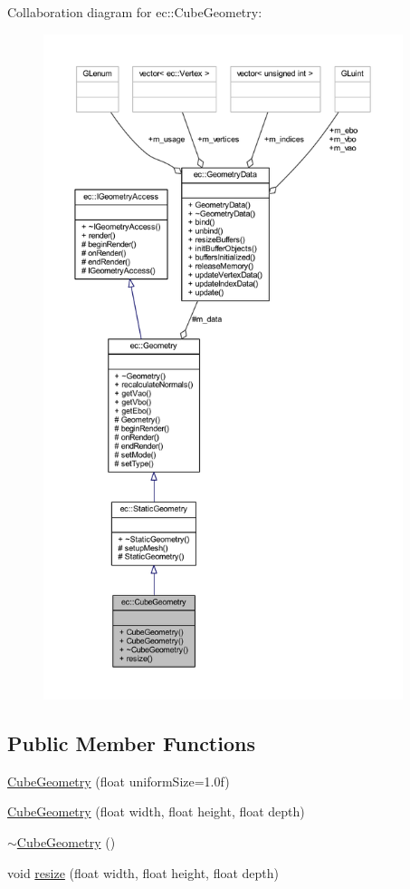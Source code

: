 Collaboration diagram for ec\+:\+:Cube\+Geometry\+:\nopagebreak
\begin{figure}[H]
\begin{center}
\leavevmode
\includegraphics[height=550pt]{classec_1_1_cube_geometry__coll__graph}
\end{center}
\end{figure}
\subsection*{Public Member Functions}
\begin{DoxyCompactItemize}
\item 
\mbox{\hyperlink{classec_1_1_cube_geometry_a539617a3a7e98e1a09af01e2328bac30}{Cube\+Geometry}} (float uniform\+Size=1.\+0f)
\item 
\mbox{\hyperlink{classec_1_1_cube_geometry_ac4ffe05d266c00e8e337233c4c48d29f}{Cube\+Geometry}} (float width, float height, float depth)
\item 
\mbox{\hyperlink{classec_1_1_cube_geometry_a8e8e46246b76cdf551d59d3f5c32d88d}{$\sim$\+Cube\+Geometry}} ()
\item 
void \mbox{\hyperlink{classec_1_1_cube_geometry_a627e0b292fee9b9c746c4ac221d167b6}{resize}} (float width, float height, float depth)
\end{DoxyCompactItemize}
